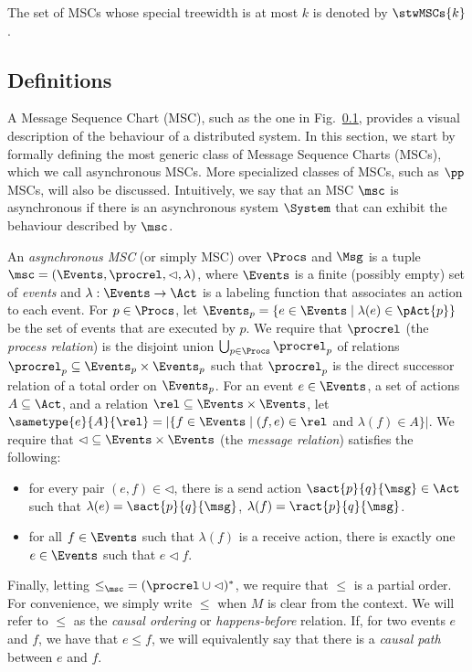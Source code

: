 The set of MSCs whose special treewidth is at most $k$ is denoted by $\stwMSCs{k}$.

\subsection{Definitions}

A Message Sequence Chart (MSC), such as the one in Fig.~\ref{}, provides a visual description of the behaviour of a distributed system. In this section, we start by formally defining the most generic class of Message Sequence Charts (MSCs), which we call asynchronous MSCs. More specialized classes of MSCs, such as $\pp$ MSCs, will also be discussed. Intuitively, we say that an MSC $\msc$ is asynchronous if there is an asynchronous system $\System$ that can exhibit the behaviour described by $\msc$.

\begin{definition}
An \emph{asynchronous MSC} (or simply MSC) over $\Procs$ and $\Msg$ is a tuple $\msc = (\Events,\procrel,\lhd,\lambda)$, where $\Events$ is a finite (possibly empty) set of \emph{events} and $\lambda: \Events \to \Act$ is a labeling function that associates an action to each event. For $p \in \Procs$, let $\Events_p = \{e \in \Events \mid \lambda(e) \in \pAct{p}\}$ be the set of events that are executed by $p$. We require that $\procrel$ (the \emph{process relation}) is the disjoint union $\bigcup_{p \in \Procs} \procrel_p$ of relations ${\procrel_p} \subseteq \Events_p \times \Events_p$ such that $\procrel_p$ is the direct successor relation of a total order on $\Events_p$. For an event $e \in \Events$, a set of actions $A \subseteq \Act$, and a relation $\rel \subseteq \Events \times \Events$,
let $\sametype{e}{A}{\rel} = |\{f \in \Events \mid (f,e) \in \rel$ and $\lambda(f) \in A\}|$. We require that ${\lhd} \subseteq \Events \times \Events$ (the \emph{message relation}) satisfies the following:
\begin{itemize}\itemsep=0.5ex
\item[(1)] for every pair $(e,f) \in {\lhd}$, there is a send action $\sact{p}{q}{\msg} \in \Act$ such that $\lambda(e) = \sact{p}{q}{\msg}$, $\lambda(f) = \ract{p}{q}{\msg}$.
\item[(2)] for all $f \in \Events$ such that $\lambda(f)$ is a receive action, there is exactly one $e \in \Events$ such that $e \lhd f$.
\end{itemize}
Finally, letting ${\le}_\msc = ({\procrel} \cup {\lhd})^\ast$,
we require that $\le$ is a partial order. For convenience, we simply write $\le$ when $M$ is clear from the context. We will refer to $\le$ as the \emph{causal ordering} or \emph{happens-before} relation. If, for two events $e$ and $f$, we have that $e \le f$, we will equivalently say that there is a \emph{causal path} between $e$ and $f$.
\end{definition}

